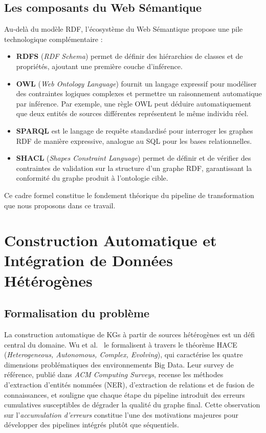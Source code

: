 \subsection{Les composants du Web Sémantique}
Au-delà du modèle RDF, l'écosystème du Web Sémantique propose une pile technologique complémentaire :
\begin{itemize}
    \item \textbf{RDFS} (\textit{RDF Schema}) permet de définir des hiérarchies de classes et de propriétés, ajoutant une première couche d'inférence.
    \item \textbf{OWL} (\textit{Web Ontology Language}) fournit un langage expressif pour modéliser des contraintes logiques complexes et permettre un raisonnement automatique par inférence. Par exemple, une règle OWL peut déduire automatiquement que deux entités de sources différentes représentent le même individu réel.
    \item \textbf{SPARQL} est le langage de requête standardisé pour interroger les graphes RDF de manière expressive, analogue au SQL pour les bases relationnelles.
    \item \textbf{SHACL} (\textit{Shapes Constraint Language}) permet de définir et de vérifier des contraintes de validation sur la structure d'un graphe RDF, garantissant la conformité du graphe produit à l'ontologie cible.
\end{itemize}
Ce cadre formel constitue le fondement théorique du pipeline de transformation que nous proposons dans ce travail.

\section{Construction Automatique et Intégration de Données Hétérogènes}\label{sec:construction_auto}
\subsection{Formalisation du problème}
La construction automatique de KGs à partir de sources hétérogènes est un défi central du domaine. Wu et al.~\cite{wu2023comprehensive} le formalisent à travers le théorème HACE (\textit{Heterogeneous, Autonomous, Complex, Evolving}), qui caractérise les quatre dimensions problématiques des environnements Big Data. Leur survey de référence, publié dans \textit{ACM Computing Surveys}, recense les méthodes d'extraction d'entités nommées (NER), d'extraction de relations et de fusion de connaissances, et souligne que chaque étape du pipeline introduit des erreurs cumulatives susceptibles de dégrader la qualité du graphe final. Cette observation sur l'\textit{accumulation d'erreurs} constitue l'une des motivations majeures pour développer des pipelines intégrés plutôt que séquentiels.


